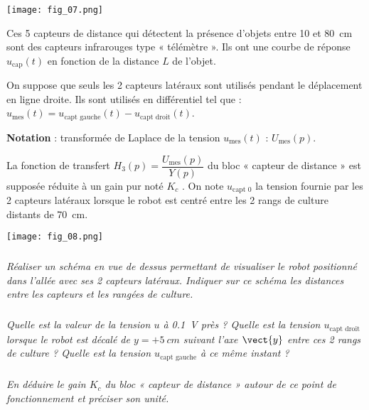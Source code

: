 \begin{multicols}{2}
\begin{center}
\texttt{[image: fig\_07.png]}
\end{center}

Ces 5 capteurs de distance qui détectent la présence d’objets entre 10 et \SI{80}{cm} sont des capteurs infrarouges type « télémètre ». Ils ont une courbe de réponse $u_{\text{cap}} (t)$ en fonction de la  distance $L$ de l’objet. 

On suppose que seuls les 2 capteurs latéraux sont utilisés pendant le déplacement en ligne droite. Ils sont utilisés en différentiel tel que :  $u_{\text{mes}}(t) = u_{\text{capt gauche}}(t) - u_{\text{capt droit}}(t)$.  

\textbf{Notation} : transformée de Laplace de la tension $u_{\text{mes}} (t)$ : $U_{\text{mes}} (p)$. 

La fonction de transfert $H_3(p) = \dfrac{U_{\text{mes}}(p)}{Y(p)}$ du bloc « capteur de distance » est supposée réduite à un gain pur noté $K_c$ . On note $u_{\text{capt 0}}$ la tension fournie par les 2 capteurs latéraux lorsque le robot est centré entre les 2 rangs de culture distants de \SI{70}{cm}. 

\begin{center}
\texttt{[image: fig\_08.png]}
\end{center}

\fi

\subparagraph{}
\textit{Réaliser un schéma en vue de dessus permettant de visualiser le robot positionné dans l’allée avec ses 2 capteurs latéraux. Indiquer sur ce schéma les distances entre les capteurs et les rangées de culture.}
\ifprof
\begin{corrige}
\end{corrige}
\else
\fi


\subparagraph{}
\textit{Quelle est la valeur de la tension $u$ à \SI{0,1}{V} près ? Quelle est la tension $u_{\text{capt droit}}$ lorsque le robot est décalé de $y = +\SI{5}{cm}$ suivant l’axe $\vect{y}$ entre ces 2 rangs de culture ? Quelle est la tension $u_{\text{capt gauche}}$ à ce même instant ? }
\ifprof
\begin{corrige}
\end{corrige}
\else
\fi


\subparagraph{}
\textit{En déduire le gain $K_c$ du bloc « capteur de distance » autour de ce point de fonctionnement et préciser son unité.}
\ifprof
\begin{corrige}
\end{corrige}
\else
\fi



\end{multicols}
